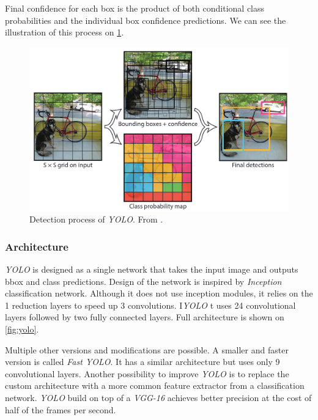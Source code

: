 Final confidence for each box is the product of both conditional class probabilities and the individual box confidence predictions. We can see the illustration of this process on \cref{fig:yoloDet}.

\begin{figure}
    \centering
    \includegraphics[width=\textwidth]{img/yoloDet}
    \caption{Detection process of \textit{YOLO}. From \cite[fig. 2]{bib:yolo}.}
    \label{fig:yoloDet} 
\end{figure}


\subsubsection{Architecture} 
\textit{YOLO} is designed as a single network that takes the input image and outputs bbox and class predictions. Design of the network is inspired by \textit{Inception} classification network. Although it does not use inception modules, it relies on the 1 reduction layers to speed up 3 convolutions. I\textit{YOLO} t uses 24 convolutional layers followed by two fully connected layers. Full architecture is shown on \cref{fig:yolo}. 

Multiple other versions and modifications are possible. A smaller and faster version is called \textit{Fast YOLO}. It has a similar architecture but uses only 9 convolutional layers. Another possibility to improve \textit{YOLO} is to replace the custom architecture with a more common feature extractor from a classification network. \textit{YOLO} build on top of a \textit{VGG-16} achieves better precision at the cost of half of the frames per second.

